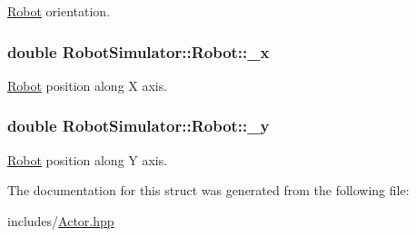 \hyperlink{structRobotSimulator_1_1Robot}{Robot} orientation. \hypertarget{structRobotSimulator_1_1Robot_ab86590932e31a8a7aad72e0173b8c0e8}{
\subsubsection[{\-\_\-x}]{\setlength{\rightskip}{0pt plus 5cm}double Robot\-Simulator\-::\-Robot\-::\-\_\-x}}\label{structRobotSimulator_1_1Robot_ab86590932e31a8a7aad72e0173b8c0e8}
\hyperlink{structRobotSimulator_1_1Robot}{Robot} position along X axis. \hypertarget{structRobotSimulator_1_1Robot_a0b386e0cb1fcdbb0ed0fd0a42d362165}{
\subsubsection[{\-\_\-y}]{\setlength{\rightskip}{0pt plus 5cm}double Robot\-Simulator\-::\-Robot\-::\-\_\-y}}\label{structRobotSimulator_1_1Robot_a0b386e0cb1fcdbb0ed0fd0a42d362165}
\hyperlink{structRobotSimulator_1_1Robot}{Robot} position along Y axis. 

The documentation for this struct was generated from the following file\-:\begin{DoxyCompactItemize}
\item 
includes/\hyperlink{Actor_8hpp}{Actor.\-hpp}\end{DoxyCompactItemize}
